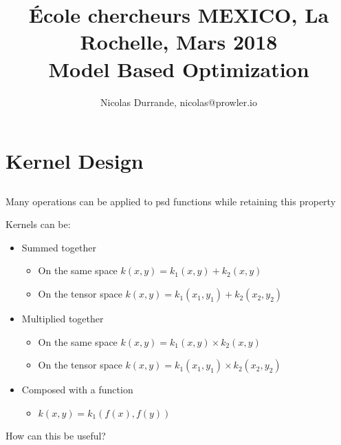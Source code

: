 \documentclass{beamer}
\title[\'Ecole chercheurs MEXICO]{ \small \'Ecole chercheurs MEXICO, La Rochelle, Mars 2018\\ \vspace{3mm} \LARGE Model Based Optimization}
\author[\quad La Rochelle, March 2018]{Nicolas Durrande, nicolas@prowler.io}
\institute[]{PROWLER.io, Cambridge (UK) -- Mines St-\'Etienne (France)}
\date{\null}
\begin{document}
\begin{frame}
  \titlepage
\end{frame}

\section{Kernel Design}
\subsection{}

\begin{frame}{}
Many operations can be applied to psd functions while retaining this property
\begin{block}{}
Kernels can be:
\begin{itemize}
  \item Summed together
  \begin{itemize}
    \item On the same space $k(x,y) = k_1(x,y) + k_2(x,y)$
    \item On the tensor space $k(x,y) = k_1(x_1,y_1) + k_2(x_2,y_2)$
  \end{itemize}
  \item Multiplied together
  \begin{itemize}
    \item On the same space $k(x,y) = k_1(x,y) \times k_2(x,y)$
    \item On the tensor space $k(x,y) = k_1(x_1,y_1) \times k_2(x_2,y_2)$
  \end{itemize}
  \item Composed with a function
  \begin{itemize}
    \item $k(x,y) = k_1(f(x),f(y))$
  \end{itemize}
\end{itemize}
\end{block}
\begin{center}
\alert{How can this be useful?}
\end{center}
\end{frame}

\end{document}
